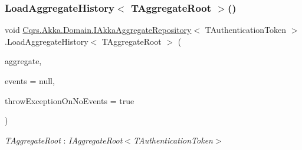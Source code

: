 \subsubsection{\texorpdfstring{Load\+Aggregate\+History$<$ T\+Aggregate\+Root $>$()}{LoadAggregateHistory< TAggregateRoot >()}}
{\footnotesize\ttfamily void \hyperlink{interfaceCqrs_1_1Akka_1_1Domain_1_1IAkkaAggregateRepository}{Cqrs.\+Akka.\+Domain.\+I\+Akka\+Aggregate\+Repository}$<$ T\+Authentication\+Token $>$.Load\+Aggregate\+History$<$ T\+Aggregate\+Root $>$ (\begin{DoxyParamCaption}\item[{T\+Aggregate\+Root}]{aggregate,  }\item[{I\+List$<$ \hyperlink{interfaceCqrs_1_1Events_1_1IEvent}{I\+Event}$<$ T\+Authentication\+Token $>$$>$}]{events = {\ttfamily null},  }\item[{bool}]{throw\+Exception\+On\+No\+Events = {\ttfamily true} }\end{DoxyParamCaption})}

\begin{Desc}
\item[Type Constraints]\begin{description}
\item[{\em T\+Aggregate\+Root} : {\em I\+Aggregate\+Root$<$T\+Authentication\+Token$>$}]\end{description}
\end{Desc}
